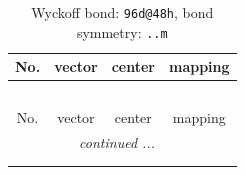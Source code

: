 \documentclass[fleqn,8pt]{jsarticle}
\begin{document}
\renewcommand{\arraystretch}{1.2}
\begin{longtable}{cccc}
\caption{Wyckoff bond: {\tt 96d@48h}, bond symmetry: {\tt ..m}}
 \\
 \hline \hline
No. & vector & center & mapping \\ \hline \endfirsthead

\multicolumn{3}{l}{\tablename\ \thetable{}} \\
 \hline \hline
No. & vector & center & mapping \\ \hline \endhead

 \hline \hline
\multicolumn{3}{r}{\footnotesize\it continued ...} \\ \endfoot

 \hline \hline
\multicolumn{3}{r}{} \\ \endlastfoot


\end{longtable}
\end{document}
